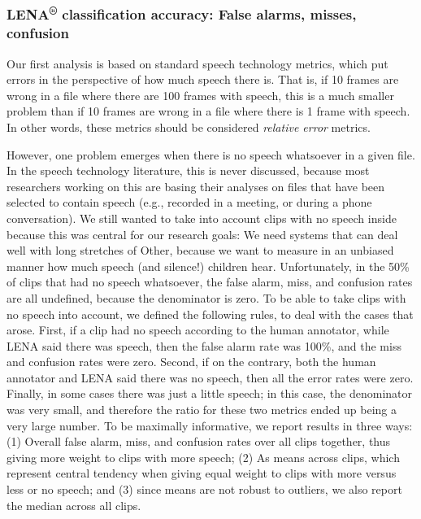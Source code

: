 \documentclass[english,table,man,floatsintext]{apa6}
\begin{document}
\hypertarget{lena-classification-accuracy-false-alarms-misses-confusion}{%
\subsubsection{\texorpdfstring{LENA\textsuperscript{®} classification accuracy: False alarms, misses, confusion}{LENA® classification accuracy: False alarms, misses, confusion}}\label{lena-classification-accuracy-false-alarms-misses-confusion}}

Our first analysis is based on standard speech technology metrics, which put errors in the perspective of how much speech there is. That is, if 10 frames are wrong in a file where there are 100 frames with speech, this is a much smaller problem than if 10 frames are wrong in a file where there is 1 frame with speech. In other words, these metrics should be considered \emph{relative error} metrics.

However, one problem emerges when there is no speech whatsoever in a given file. In the speech technology literature, this is never discussed, because most researchers working on this are basing their analyses on files that have been selected to contain speech (e.g., recorded in a meeting, or during a phone conversation). We still wanted to take into account clips with no speech inside because this was central for our research goals: We need systems that can deal well with long stretches of Other, because we want to measure in an unbiased manner how much speech (and silence!) children hear. Unfortunately, in the 50\% of clips that had no speech whatsoever, the false alarm, miss, and confusion rates are all undefined, because the denominator is zero.
To be able to take clips with no speech into account, we defined the following rules, to deal with the cases that arose. First, if a clip had no speech according to the human annotator, while LENA said there was speech, then the false alarm rate was 100\%, and the miss and confusion rates were zero. Second, if on the contrary, both the human annotator and LENA said there was no speech, then all the error rates were zero. Finally, in some cases there was just a little speech; in this case, the denominator was very small, and therefore the ratio for these two metrics ended up being a very large number. To be maximally informative, we report results in three ways: (1) Overall false alarm, miss, and confusion rates over all clips together, thus giving more weight to clips with more speech; (2) As means across clips, which represent central tendency when giving equal weight to clips with more versus less or no speech; and (3) since means are not robust to outliers, we also report the median across all clips.
\end{document}
